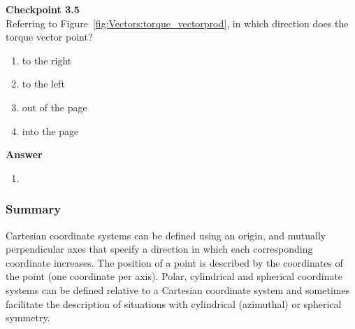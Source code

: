 \begin{framed}
\textbf{Checkpoint 3.5}\\
Referring to Figure~\ref{fig:Vectors:torque_vectorprod}, in which direction does the torque vector point?

\begin{enumerate}
\item to the right
\item to the left
\item out of the page
\item into the page
\end{enumerate}

\begin{framed}
\textbf{Answer}\\
\begin{enumerate}[resume]
\item
\end{enumerate}
\end{framed}
\end{framed}

\subsubsection{Summary}

Cartesian coordinate systems can be defined using an origin, and mutually perpendicular axes that specify a direction in which each corresponding coordinate increases. The position of a point is described by the coordinates of the point (one coordinate per axis). Polar, cylindrical and spherical coordinate systems can be defined relative to a Cartesian coordinate system and sometimes facilitate the description of situations with cylindrical (azimuthal) or spherical symmetry.

